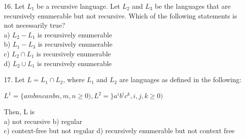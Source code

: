 \documentclass[8pt]{beamer}
\begin{document}
\begin{frame}
16. Let $L _{1}$ be a recursive language. Let $L _{2}$ and $L _{3}$ be the languages that are recursively enumerable but
not recursive. Which of the following statements is not necessarily true?\\
\hspace*{0.5cm} a) $L _{2} - L _{1}$ is recursively enumerable\\
\hspace*{0.5cm} b) $L _{1} - L _{3}$ is recursively enumerable\\
\hspace*{0.5cm} c) $L _{2} \cap L _{1}$ is recursively enumerable\\
\hspace*{0.5cm} d) $L _{2} \cup L _{1}$ is recursively enumerable\\
\vspace*{0.2cm}

\hspace*{-0.4cm}
17. Let $L = L _{1} \cap L _{2}$, where $L _{1}$ and $L _{2}$ are languages as defined in the following:\\
\vspace*{0.1cm}

\begin{center}
  $L ^{1} = \{ambmcanbn, m, n \geq 0), L ^{2} = \}a ^{i} b ^{i} c ^{k}, i, j, k \geq 0)$\\
\end{center}

Then, L is\\

\vspace*{0.1cm}
\hspace*{0.5cm} a) not recursive  \hspace*{2.5cm}  b) regular\\
\hspace*{0.5cm} c) context-free but not regular   \hspace*{0.5cm} d) recursively enumerable but not context free\\
\end{frame}
\end{document}
